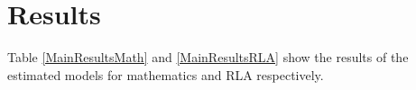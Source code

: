 \section{Results}

Table \ref{MainResultsMath} and \ref{MainResultsRLA} show the results of the estimated models for mathematics and RLA respectively.







